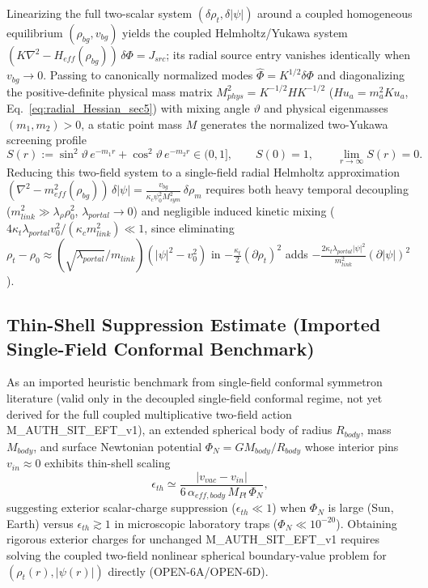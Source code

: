 \documentclass[american,11pt,letterpaper]{article}
\def\mathrm#1{#1}%
\def\texttt#1{#1}%
\def\emph#1{#1}%
\begin{document}
Linearizing the full two-scalar system $(\delta\rho_t, \delta|\psi|)$ around a coupled homogeneous equilibrium $(\rho_{\mathrm{bg}}, v_{\mathrm{bg}})$ yields the coupled Helmholtz/Yukawa system $(K\nabla^2 - H_{\mathrm{eff}}(\rho_{\mathrm{bg}}))\,\delta\Phi = J_{\mathrm{src}}$; its radial source entry vanishes identically when $v_{\mathrm{bg}} \to 0$. Passing to canonically normalized modes $\hat{\Phi} = K^{1/2}\delta\Phi$ and diagonalizing the positive-definite physical mass matrix $M_{\mathrm{phys}}^2 = K^{-1/2} H K^{-1/2}$ ($H u_a = m_a^2 K u_a$, Eq.~\eqref{eq:radial_Hessian_sec5}) with mixing angle $\vartheta$ and physical eigenmasses $(m_1, m_2) > 0$, a static point mass $M$ generates the normalized two-Yukawa screening profile
\begin{equation}
S(r) := \sin^2\vartheta\,e^{-m_1 r} + \cos^2\vartheta\,e^{-m_2 r} \in (0, 1],
\qquad
S(0) = 1,
\qquad
\lim_{r\to\infty} S(r) = 0.
\label{eq:two_yukawa_S_profile}
\end{equation}
Reducing this two-field system to a single-field radial Helmholtz approximation $(\nabla^2 - m_{\mathrm{eff}}^2(\rho_{\mathrm{bg}}))\,\delta|\psi| = \frac{v_{\mathrm{bg}}}{\kappa_c\psi_0^2 M_{\mathrm{sym}}^2}\,\delta\rho_m$ requires \emph{both} heavy temporal decoupling ($m_{\mathrm{link}}^2 \gg \lambda_\rho\rho_0^2$, $\lambda_{\mathrm{portal}} \to 0$) \emph{and} negligible induced kinetic mixing ($4\kappa_t\lambda_{\mathrm{portal}} v_0^2 / (\kappa_c m_{\mathrm{link}}^2) \ll 1$, since eliminating $\rho_t - \rho_0 \approx (\sqrt{\lambda_{\mathrm{portal}}}/m_{\mathrm{link}})(|\psi|^2 - v_0^2)$ in $-\frac{\kappa_t}{2}(\partial\rho_t)^2$ adds $-\frac{2\kappa_t\lambda_{\mathrm{portal}}|\psi|^2}{m_{\mathrm{link}}^2}(\partial|\psi|)^2$).

\subsection{Thin-Shell Suppression Estimate (Imported Single-Field Conformal Benchmark)}

As an \emph{imported heuristic benchmark} from single-field conformal symmetron literature (valid only in the decoupled single-field conformal regime, not yet derived for the full coupled multiplicative two-field action \texttt{M\_AUTH\_SIT\_EFT\_v1}), an extended spherical body of radius $R_{\mathrm{body}}$, mass $M_{\mathrm{body}}$, and surface Newtonian potential $\Phi_N = G M_{\mathrm{body}} / R_{\mathrm{body}}$ whose interior pins $v_{\mathrm{in}} \approx 0$ exhibits thin-shell scaling
\begin{equation}
\epsilon_{\mathrm{th}} \simeq \frac{|v_{\mathrm{vac}} - v_{\mathrm{in}}|}{6\,\alpha_{\mathrm{eff,body}}\,M_{\mathrm{Pl}}\,\Phi_N},
\label{eq:thin_shell_factor}
\end{equation}
suggesting exterior scalar-charge suppression ($\epsilon_{\mathrm{th}} \ll 1$) when $\Phi_N$ is large (Sun, Earth) versus $\epsilon_{\mathrm{th}} \gtrsim 1$ in microscopic laboratory traps ($\Phi_N \ll 10^{-20}$). Obtaining rigorous exterior charges for unchanged \texttt{M\_AUTH\_SIT\_EFT\_v1} requires solving the coupled two-field nonlinear spherical boundary-value problem for $(\rho_t(r), |\psi(r)|)$ directly (\texttt{OPEN-6A}/\texttt{OPEN-6D}).
\end{document}

